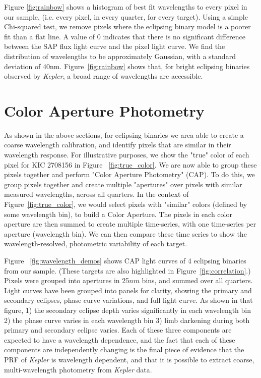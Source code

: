 \documentclass[iop]{emulateapj}
\newcommand{\kepler}{\emph{Kepler}\xspace}
\newcommand{\target}{KIC 2708156\xspace}
\begin{document}
Figure \ref{fig:rainbow} shows a histogram of best fit wavelengths to every pixel in our sample, (i.e. every pixel, in every quarter, for every target). Using a simple Chi-squared test, we remove pixels where the eclipsing binary model is a poorer fit than a flat line. A value of 0 indicates that there is no significant difference between the SAP flux light curve and the pixel light curve. We find the distribution of wavelengths to be approximately Gaussian, with a standard deviation of 40nm. Figure~\ref{fig:rainbow} shows that, for bright eclipsing binaries observed by \kepler, a broad range of wavelengths are accessible. 

\section{Color Aperture Photometry}
\label{sec:coloraperturephotometry}
As shown in the above sections, for eclipsing binaries we area able to create a coarse wavelength calibration, and identify pixels that are similar in their wavelength response. For illustrative purposes, we show the "true" color of each pixel for \target in Figure ~\ref{fig:true_color}. We are now able to group these pixels together and perform "Color Aperture Photometry" (CAP). To do this, we group pixels together and create multiple "apertures" over pixels with similar measured wavelengths, across all quarters. In the context of Figure~\ref{fig:true_color}, we would select pixels with "similar" colors (defined by some wavelength bin), to build a Color Aperture. The pixels in each color aperture are then summed to create multiple time-series, with one time-series per aperture (wavelength bin). We can then compare these time series to show the wavelength-resolved, photometric variability of each target.

Figure ~\ref{fig:wavelength_demos} shows CAP light curves of 4 eclipsing binaries from our sample. (These targets are also highlighted in Figure~\ref{fig:correlation}.) Pixels were grouped into apertures in 25$nm$ bins, and summed over all quarters. Light curves have been grouped into panels for clarity, showing the primary and secondary eclipses, phase curve variations, and full light curve. As shown in that figure, 1) the secondary eclipse depth varies significantly in each wavelength bin 2) the phase curve varies in each wavelength bin 3) limb darkening during both primary and secondary eclipse varies. Each of these three components are expected to have a wavelength dependence, and the fact that each of these components are independently changing is the final piece of evidence that the PRF of \kepler is wavelength dependent, and that it is possible to extract coarse, multi-wavelength photometry from \kepler data.
\end{document}
